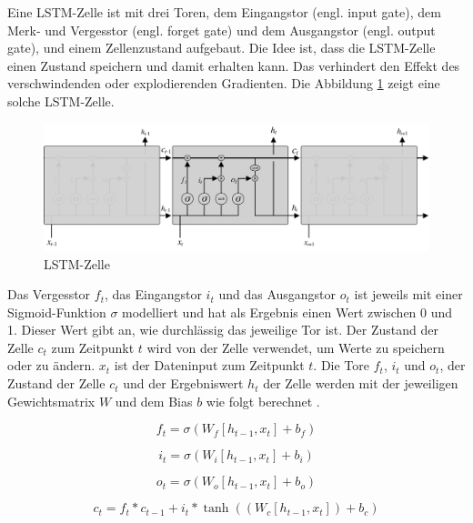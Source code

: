 Eine \ac{LSTM}-Zelle ist mit drei Toren, dem Eingangstor (engl. input gate), dem Merk- und Vergesstor (engl. forget gate) und dem Ausgangstor (engl. output gate), und einem Zellenzustand aufgebaut. Die Idee ist, dass die \ac{LSTM}-Zelle einen Zustand speichern und damit erhalten kann. Das verhindert den Effekt des verschwindenden oder explodierenden Gradienten. Die Abbildung \ref{fig_lstm} zeigt eine solche \ac{LSTM}-Zelle.

\begin{figure}[h]
\centering
\includegraphics[scale=0.4]{images/lstm.pdf}
\caption[\acl{LSTM}-Zelle]{\acl{LSTM}-Zelle \cite{olah2015lstm}}
\label{fig_lstm}
\end{figure}

Das Vergesstor $f_t$, das Eingangstor $i_t$ und das Ausgangstor $o_t$ ist jeweils mit einer Sigmoid-Funktion $\sigma$ modelliert und hat als Ergebnis einen Wert zwischen 0 und 1. Dieser Wert gibt an, wie durchlässig das jeweilige Tor ist. Der Zustand der Zelle $c_t$ zum Zeitpunkt $t$ wird von der Zelle verwendet, um Werte zu speichern oder zu ändern. $x_t$ ist der Dateninput zum Zeitpunkt $t$. Die Tore $f_t$, $i_t$ und $o_t$, der Zustand der Zelle $c_t$ und der Ergebniswert $h_t$ der Zelle werden mit der jeweiligen Gewichtsmatrix $W$ und dem Bias $b$ wie folgt berechnet \cite{olah2015lstm}.

\begin{equation}
f_t = \sigma (W_f[h_{t-1}, x_t] + b_f)
\end{equation}

\begin{equation}
i_t = \sigma (W_i[h_{t-1}, x_t] + b_i)
\end{equation}

\begin{equation}
o_t = \sigma (W_o[h_{t-1}, x_t] + b_o)
\end{equation}

\begin{equation}
c_t = f_t * c_{t-1} + i_t * \tanh((W_c[h_{t-1}, x_t]) + b_c)
\end{equation}

